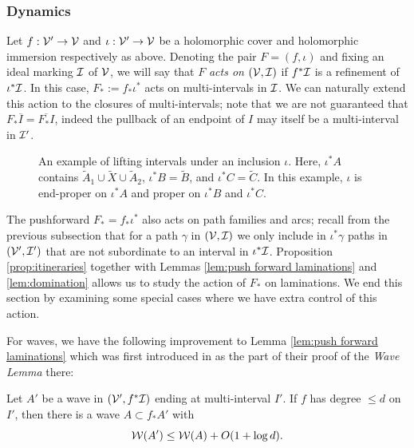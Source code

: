 \documentclass[12pt]{amsart}
\begin{document}
\subsubsection{Dynamics}\label{sec:dynamics}

Let $f:\mathcal V'\to \mathcal V$ and $\iota:\mathcal V'\to \mathcal V$ be a holomorphic cover and holomorphic immersion respectively as above. 
Denoting the pair $F= (f, \iota)$ and fixing an ideal marking $\mathcal I$ of $\mathcal V$, we will say that $F$ \textit{acts on $(\mathcal V, \mathcal I)$} if $f^*\mathcal I$ is a refinement of $\iota^*\mathcal I$. In this case, $F_*:= f_*\iota^*$ acts on multi-intervals in $\mathcal I$. We can naturally extend this action to the closures of multi-intervals; note that we are not guaranteed that $F_*\overline{I} = \overline{F_*I}$, indeed the pullback of an endpoint of $I$ may itself be a multi-interval in $\mathcal I'$. 

\begin{figure}
	\begin{center}
		\def\svgwidth{4.5in}
		
		\caption{
        An example of lifting intervals under an inclusion $\iota$. Here, $\iota^*A$ contains $\tilde A_1\cup \tilde X\cup \tilde A_2$, $\iota^*B = \tilde B$, and $\iota^* C = \tilde C$. In this example,  $\iota$ is end-proper on $\iota^*A$ and proper on $\iota^*B$ and $\iota^*C$.}
		\label{fig:lift}
	\end{center}
\end{figure}

The pushforward $F_* = f_*\iota^*$ also acts on path families and arcs; recall from the previous subsection that for a path $\gamma$ in $(\mathcal V, \mathcal I)$ we only include in $\iota^*\gamma$ paths in $(\mathcal V', \mathcal I')$ that are not subordinate to an interval in $\iota^*\mathcal I$.
Proposition \ref{prop:itineraries} together with Lemmas \ref{lem:push forward laminations} and \ref{lem:domination} allows us to study the action of $F_*$ on laminations. 
We end this section by examining some special cases where we have extra control of this action.



For waves, we have the following improvement to 
Lemma \ref{lem:push forward laminations} which was first introduced in \cite[Lemma 5.2]{dudko2023mlcfeigenbaumpoints} as the part of their proof of the \textit{Wave Lemma} there:
\begin{lemma}\label{lem:wave}
	Let $A'$ be a wave in $(\mathcal V', f^*\mathcal I)$ ending at multi-interval $I'$.  If $f$ has degree $\leq d$ on $I'$, then there is a wave $A\subset f_*A'$  with 
	$$\mathcal W(A')\leq \mathcal W(A)+ O(1+\log d).$$
\end{lemma}
\end{document}
